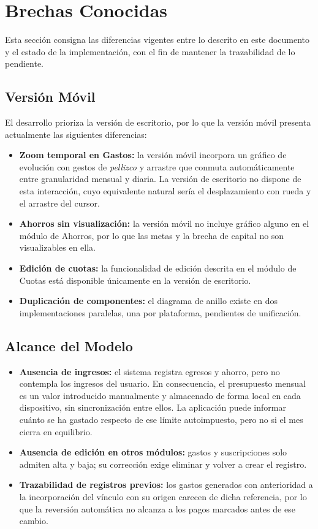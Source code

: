 \section{Brechas Conocidas}
Esta sección consigna las diferencias vigentes entre lo descrito en este documento y el estado de la implementación, con el fin de mantener la trazabilidad de lo pendiente.

\subsection{Versión Móvil}
El desarrollo prioriza la versión de escritorio, por lo que la versión móvil presenta actualmente las siguientes diferencias:
\begin{itemize}
    \item \textbf{Zoom temporal en Gastos:} la versión móvil incorpora un gráfico de evolución con gestos de \textit{pellizco} y arrastre que conmuta automáticamente entre granularidad mensual y diaria. La versión de escritorio no dispone de esta interacción, cuyo equivalente natural sería el desplazamiento con rueda y el arrastre del cursor.
    \item \textbf{Ahorros sin visualización:} la versión móvil no incluye gráfico alguno en el módulo de Ahorros, por lo que las metas y la brecha de capital no son visualizables en ella.
    \item \textbf{Edición de cuotas:} la funcionalidad de edición descrita en el módulo de Cuotas está disponible únicamente en la versión de escritorio.
    \item \textbf{Duplicación de componentes:} el diagrama de anillo existe en dos implementaciones paralelas, una por plataforma, pendientes de unificación.
\end{itemize}

\subsection{Alcance del Modelo}
\begin{itemize}
    \item \textbf{Ausencia de ingresos:} el sistema registra egresos y ahorro, pero no contempla los ingresos del usuario. En consecuencia, el presupuesto mensual es un valor introducido manualmente y almacenado de forma local en cada dispositivo, sin sincronización entre ellos. La aplicación puede informar cuánto se ha gastado respecto de ese límite autoimpuesto, pero no si el mes cierra en equilibrio.
    \item \textbf{Ausencia de edición en otros módulos:} gastos y suscripciones solo admiten alta y baja; su corrección exige eliminar y volver a crear el registro.
    \item \textbf{Trazabilidad de registros previos:} los gastos generados con anterioridad a la incorporación del vínculo con su origen carecen de dicha referencia, por lo que la reversión automática no alcanza a los pagos marcados antes de ese cambio.
\end{itemize}
